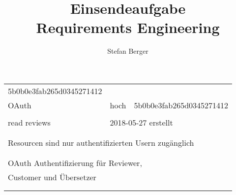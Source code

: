 \documentclass{article}
\begin{document}
\title{\Large Einsendeaufgabe \\ Requirements Engineering}
\author{\normalsize Stefan Berger}
\date{}
\maketitle

\vspace{160px}

\pagebreak


\resizebox{10cm}{!} {
\begin{tabular}{lllll}
  \hline
  \multicolumn{2}{|l|}{\tiny{\color{g}{ID:}} \tiny{5b0b0e3fab265d0345271412}} & \footnotesize{\color{g}{Prio}} & \multicolumn{2}{|l|}{\footnotesize{\color{g}{Abhängigkeiten:}}} \\
  \multicolumn{2}{|l|}{\footnotesize{\color{g}{Name:}} OAuth} & hoch & \multicolumn{2}{|l|}{\tiny{5b0b0e3fab265d0345271412}} \\
  \hline
  \multicolumn{2}{|l|}{\footnotesize{\color{g}{Use Case}}} & \multicolumn{3}{|l|}{\footnotesize{\color{g}{Verlauf}}} \\
  \multicolumn{2}{|l|}{read reviews} & \multicolumn{3}{|l|}{2018-05-27 erstellt} \\
  \multicolumn{2}{|l|}{} & \multicolumn{3}{|l|}{} \\
  \hline
  \multicolumn{5}{|l|}{\footnotesize{\color{g}{Abnahmekriterium}}} \\
  \multicolumn{5}{|l|}{Resourcen sind nur authentifizierten Usern zugänglich} \\
  \multicolumn{5}{|l|}{} \\
  \hline
  \multicolumn{5}{|l|}{\footnotesize{\color{g}{Beschreibung}}} \\
  \multicolumn{5}{|l|}{OAuth Authentifizierung für Reviewer,} \\
  \multicolumn{5}{|l|}{Customer und Übersetzer} \\
  \multicolumn{5}{|l|}{} \\
  \multicolumn{5}{|l|}{} \\
  \hline
\end{tabular}
}
\end{document}
